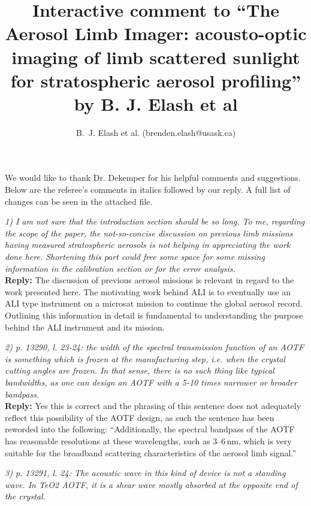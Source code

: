 \documentclass[12pt, notitlepage]{article}
\title{Interactive comment to ``The Aerosol Limb Imager: acousto-optic imaging of limb scattered
sunlight for stratospheric aerosol profiling'' by B. J. Elash et al}
\author{B.~J. Elash et al. (brenden.elash@usask.ca)}
\begin{document}
\begin{titlepage}
\maketitle
\end{titlepage}


We would like to thank Dr. Dekemper for his helpful comments and suggestions. Below are the referee's comments in italics followed by our reply. A full list of changes can be seen in the attached file.

\hrulefill

\textit{1) I am not sure that the introduction section should be so long. To me, regarding the
scope of the paper, the not-so-concise discussion on previous limb missions having
measured stratospheric aerosols is not helping in appreciating the work done here.
Shortening this part could free some space for some missing information in the calibration
section or for the error analysis.}\\

\textbf{Reply:} The discussion of previous aerosol missions is relevant in regard to the work presented here. The motivating work behind ALI is to eventually use an ALI type instrument on a microsat mission to continue the global aerosol record. Outlining this information in detail is fundamental to understanding the purpose behind the ALI instrument and its mission.

\hrulefill

\textit{2) p. 13290, l. 23-24: the width of the spectral transmission function of an AOTF
is something which is frozen at the manufacturing step, i.e. when the crystal cutting
angles are frozen. In that sense, there is no such thing like typical bandwidths, as one
can design an AOTF with a 5-10 times narrower or broader bandpass.}\\

\textbf{Reply:} Yes this is correct and the phrasing of this sentence does not adequately reflect this possibility of the AOTF design, as such the sentence has been reworded into the following: ``Additionally, the spectral bandpass of the AOTF has reasonable resolutions at these wavelengths, such as 3--6\,nm, which is very suitable for the broadband scattering characteristics of the aerosol limb signal.''

\hrulefill

\textit{3) p. 13291, l. 24: The acoustic wave in this kind of device is not a standing wave. In
TeO2 AOTF, it is a shear wave mostly absorbed at the opposite end of the crystal.}\\
\end{document}
